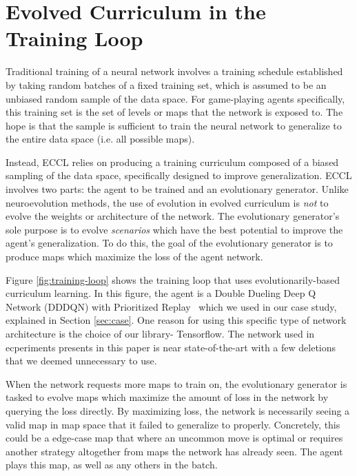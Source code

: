 \documentclass[letterpaper]{article} %
\begin{document}
\section{Evolved Curriculum in the Training Loop}\label{sec:theory}

Traditional training of a neural network involves a training schedule established by taking random batches of a fixed training set, which is assumed to be an unbiased random sample of the data space. For game-playing agents specifically, this training set is the set of levels or maps that the network is exposed to. The hope is that the sample is sufficient to train the neural network to generalize to the entire data space (i.e. all possible maps). 

Instead, ECCL relies on producing a training curriculum composed of a biased sampling of the data space, specifically designed to improve generalization. ECCL involves two parts: the agent to be trained and an evolutionary generator. Unlike neuroevolution methods, the use of evolution in evolved curriculum is \emph{not} to evolve the weights or architecture of the network. The evolutionary generator's sole purpose is to evolve \emph{scenarios} which have the best potential to improve the agent's generalization. To do this, the goal of the evolutionary generator is to produce maps which maximize the loss of the agent network. 

Figure \ref{fig:training-loop} shows the training loop that uses evolutionarily-based curriculum learning. In this figure, the agent is a Double Dueling Deep Q Network (DDDQN) with Prioritized Replay~\cite{wang2016dueling,schaul2015prioritized} which we used in our case study, explained in Section \ref{sec:case}. One reason for using this specific type of network architecture is the choice of our library- Tensorflow. The network used in ecperiments presents in this paper is near state-of-the-art with a few deletions that we deemed unnecessary to use. 

When the network requests more maps to train on, the evolutionary generator is tasked to evolve maps which maximize the amount of loss in the network by querying the loss directly. By maximizing loss, the network is necessarily seeing a valid map in map space that it failed to generalize to properly. Concretely, this could be a edge-case map that where an uncommon move is optimal or requires another strategy altogether from maps the network has already seen. The agent plays this map, as well as any others in the batch.
\end{document}
